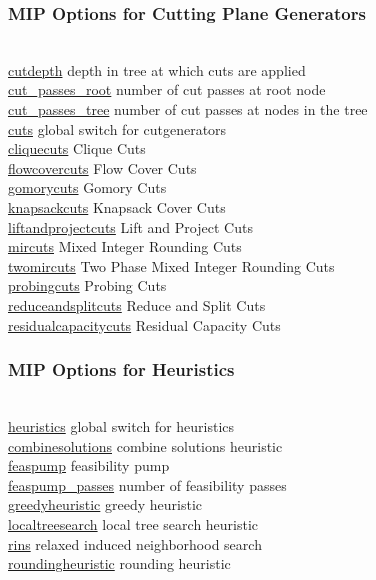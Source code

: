 \subsubsection{MIP Options for Cutting Plane Generators}
\begin{tabbing}
\hspace {1.3in} \= \\
\hyperlink{cutdepth}
{cutdepth} \> depth in tree at which cuts are applied \\
\hyperlink{cut_passes_root}
{cut\_passes\_root} \> number of cut passes at root node \\
\hyperlink{cut_passes_tree}
{cut\_passes\_tree} \> number of cut passes at nodes in the tree \\
\hyperlink{cuts}
{cuts} \> global switch for cutgenerators \\
\hyperlink{cliquecuts}
{cliquecuts} \> Clique Cuts \\
\hyperlink{flowcovercuts}
{flowcovercuts} \> Flow Cover Cuts \\
\hyperlink{gomorycuts}
{gomorycuts} \> Gomory Cuts \\
\hyperlink{knapsackcuts}
{knapsackcuts} \> Knapsack Cover Cuts \\
\hyperlink{liftandprojectcuts}
{liftandprojectcuts} \> Lift and Project Cuts \\
\hyperlink{mircuts}
{mircuts} \> Mixed Integer Rounding Cuts \\
\hyperlink{twomircuts}
{twomircuts} \> Two Phase Mixed Integer Rounding Cuts \\
\hyperlink{probingcuts}
{probingcuts} \> Probing Cuts \\
\hyperlink{reduceandsplitcuts}
{reduceandsplitcuts} \> Reduce and Split Cuts \\
\hyperlink{residualcapacitycuts}
{residualcapacitycuts} \> Residual Capacity Cuts \\
\end{tabbing}


\subsubsection{MIP Options for Heuristics}
\begin{tabbing}
\hspace {1.3in} \= \\
\hyperlink{heuristics}
{heuristics} \> global switch for heuristics \\
\hyperlink{combinesolutions}
{combinesolutions} \> combine solutions heuristic \\
\hyperlink{feaspump}
{feaspump} \> feasibility pump \\
\hyperlink{feaspump_passes}
{feaspump\_passes} \> number of feasibility passes \\
\hyperlink{greedyheuristic}
{greedyheuristic} \> greedy heuristic \\
\hyperlink{localtreesearch}
{localtreesearch} \> local tree search heuristic \\
\hyperlink{rins}
{rins} \> relaxed induced neighborhood search \\
\hyperlink{roundingheuristic}
{roundingheuristic} \> rounding heuristic \\
\end{tabbing}

